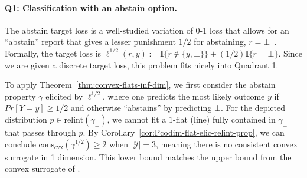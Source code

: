 \documentclass{article} %
\newcommand{\relint}[1]{\mathrm{relint}(#1)}
\newcommand{\conscvx}{\mathrm{cons}_\mathrm{cvx}}
\newcommand{\Y}{\mathcal{Y}}
\newcommand{\Ind}[1]{\mathbf{I}\{{#1}\}}
\begin{document}
\paragraph{Q1: Classification with an abstain option.}
The abstain target loss is a well-studied variation of 0-1 loss that allows for an ``abstain'' report that gives a lesser punishment $1/2$ for abstaining, $r = \bot$~\citep{ramaswamy2018consistent,ramaswamy2016convex,madras2018predict,chow1957optimum,cortes2016learning}.
Formally, the target loss is $\ell^{1/2}(r,y) := \Ind{r \not \in \{y, \bot\}} + (1/2)\Ind{r = \bot}$.
Since we are given a discrete target loss, this problem fits nicely into Quadrant 1.

To apply Theorem~\ref{thm:convex-flats-inf-dim}, we first consider the abstain property $\gamma$ elicited by $\ell^{1/2}$, where one predicts the most likely outcome $y$ if $Pr[Y=y] \geq 1/2$ and otherwise ``abstains'' by predicting $\bot$.
For the depicted distribution $p \in \relint{\gamma_\bot}$, we cannot fit a $1$-flat (line) fully contained in $\gamma_\bot$ that passes through $p$.
By Corollary~\ref{cor:Pcodim-flat-elic-relint-prop}, we can conclude $\conscvx(\gamma^{1/2}) \geq 2$ when $|\Y|=3$, meaning there is no consistent convex surrogate in 1 dimension.
This lower bound matches the upper bound from the convex surrogate of
\citet{ramaswamy2016convex}.
\end{document}
